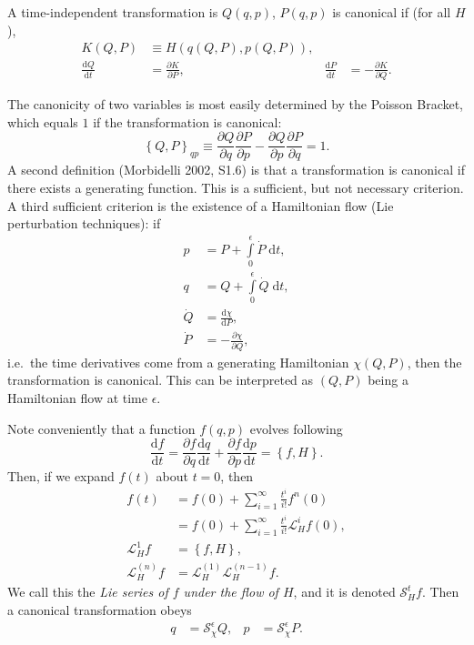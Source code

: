 \documentclass[12pt]{article}
\newcommand*{\rd}[2]{\frac{\mathrm{d}#1}{\mathrm{d}#2}}
\newcommand*{\pd}[2]{\frac{\partial#1}{\partial#2}}
\newcommand*{\p}[1]{\left(#1\right)}
\newcommand*{\z}[1]{\left\{#1\right\}}
\begin{document}
A time-independent transformation is $Q(q, p)$, $P(q, p)$ is canonical if (for
all $H$),
\begin{align}
    K(Q, P) &\equiv H\p{q(Q, P), p(Q, P)},\\
    \rd{Q}{t} &= \pd{K}{P}, &
    \rd{P}{t} &= -\pd{K}{Q}.
\end{align}

The canonicity of two variables is most easily determined by the Poisson
Bracket, which equals $1$ if the transformation is canonical:
\begin{equation}
    \z{Q, P}_{qp}
        \equiv \pd{Q}{q}\pd{P}{p} - \pd{Q}{p}\pd{P}{q} = 1.
\end{equation}
A second definition (Morbidelli 2002, S1.6) is that a transformation is
canonical if there exists a generating function. This is a sufficient, but not
necessary criterion. A third sufficient criterion is the existence of a
Hamiltonian flow (Lie perturbation techniques): if
\begin{align}
    p &= P + \int\limits_0^\epsilon
        \dot{P}\;\mathrm{d}t,\\
    q &= Q + \int\limits_0^\epsilon \dot{Q}\;\mathrm{d}t,\\
    \dot{Q} &= \rd{\chi}{P},\\
    \dot{P} &= -\pd{\chi}{Q},
\end{align}
i.e.\ the time derivatives come from a generating Hamiltonian $\chi\p{Q, P}$,
then the transformation is canonical. This can be interpreted as $(Q, P)$ being
a Hamiltonian flow at time $\epsilon$.

Note conveniently that a function $f(q, p)$ evolves following
\begin{equation}
    \rd{f}{t} = \pd{f}{q}\rd{q}{t} + \pd{f}{p}\rd{p}{t} = \z{f, H}.
\end{equation}
Then, if we expand $f(t)$ about $t=0$, then
\begin{align}
    f(t) &= f(0) + \sum\limits_{i=1}^\infty \frac{t^i}{i!}f^{{n}}(0)\nonumber\\
        &= f(0) + \sum\limits_{i=1}^\infty \frac{t^i}{i!}
            \mathcal{L}_H^{{i}}f(0),\\
    \mathcal{L}_H^{{1}}f &= \z{f, H},\\
    \mathcal{L}_H^{(n)}f &= \mathcal{L}_H^{(1)}\mathcal{L}_H^{(n-1)}f.
\end{align}
We call this the \emph{Lie series of $f$ under the flow of $H$}, and it is
denoted $\mathcal{S}_H^tf$. Then a canonical transformation obeys
\begin{align}
    q &= \mathcal{S}_\chi^\epsilon Q, &
    p &= \mathcal{S}_\chi^\epsilon P.
\end{align}
\end{document}
